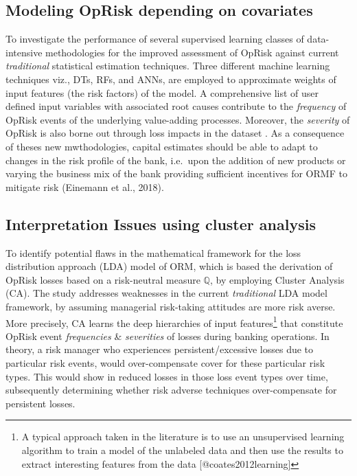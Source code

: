 \documentclass[]{DissertateUSU}
\let\rmarkdownfootnote\footnote%
\def\footnote{\protect\rmarkdownfootnote}
\begin{document}
\subsection{Modeling OpRisk depending on covariates}

To investigate the performance of several supervised learning classes of
data-intensive methodologies for the improved assessment of OpRisk
against current \emph{traditional} statistical estimation techniques.
Three different machine learning techniques viz., DTs, RFs, and ANNs,
are employed to approximate weights of input features (the risk factors)
of the model. A comprehensive list of user defined input variables with
associated root causes contribute to the \emph{frequency} of OpRisk
events of the underlying value-adding processes. Moreover, the
\emph{severity} of OpRisk is also borne out through loss impacts in the
dataset . As a consequence of theses new mwthodologies, capital
estimates should be able to adapt to changes in the risk profile of the
bank, i.e.~upon the addition of new products or varying the business mix
of the bank providing sufficient incentives for ORMF to mitigate risk
(Einemann et al., 2018).

\subsection{Interpretation Issues using cluster analysis}

To identify potential flaws in the mathematical framework for the loss
distribution approach (LDA) model of ORM, which is based the derivation
of OpRisk losses based on a risk-neutral measure \(\mathbb{Q}\), by
employing Cluster Analysis (CA). The study addresses weaknesses in the
current \emph{traditional} LDA model framework, by assuming managerial
risk-taking attitudes are more risk averse. More precisely, CA learns
the deep hierarchies of input
features\footnote{A typical approach taken in the literature is to use an unsupervised learning algorithm to train a model of the unlabeled data and then use the results to extract interesting features from the data [@coates2012learning]}
that constitute OpRisk event \emph{frequencies} \& \emph{severities} of
losses during banking operations. In theory, a risk manager who
experiences persistent/excessive losses due to particular risk events,
would over-compensate cover for these particular risk types. This would
show in reduced losses in those loss event types over time, subsequently
determining whether risk adverse techniques over-compensate for
persistent losses.
\end{document}
